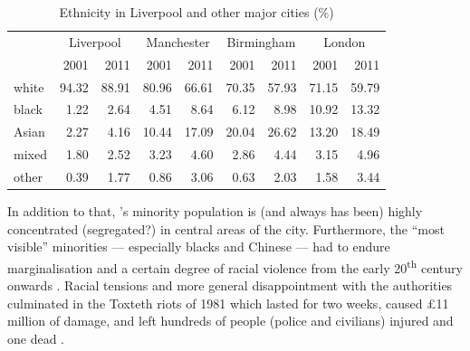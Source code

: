 	\begin{table}[h]
		\centering
		\caption{Ethnicity in Liverpool and other major cities (\%)}
		\begin{tabular}{lrrrrrrrr}
			\hline
	 		& \multicolumn{2}{c}{Liverpool} & \multicolumn{2}{c}{Manchester} & \multicolumn{2}{c}{Birmingham} & \multicolumn{2}{c}{London} \\
			 & 2001 & 2011 & 2001 & 2011 & 2001 & 2011 & 2001 & 2011 \\
			 \hline
			 white & 94.32 & 88.91 & 80.96 & 66.61 & 70.35 & 57.93 & 71.15 & 59.79 \\
			 black & 1.22 & 2.64 & 4.51 & 8.64 & 6.12 & 8.98 & 10.92 & 13.32 \\
	 		 Asian & 2.27 & 4.16 & 10.44 & 17.09 & 20.04 & 26.62 & 13.20 & 18.49 \\
	 		 mixed & 1.80 & 2.52 & 3.23 & 4.60 & 2.86 & 4.44 & 3.15 & 4.96 \\
	 		 other & 0.39 & 1.77 & 0.86 & 3.06 & 0.63 & 2.03 & 1.58 & 3.44 \\
	 		 \hline
		\end{tabular}
		\label{tab.ethnicity}
	\end{table}

In addition to that, 's minority population is (and always has been) highly concentrated (segregated?) in central areas of the city.
Furthermore, the ``most visible'' minorities --- especially blacks and Chinese --- had to endure marginalisation and a certain degree of racial violence from the early 20\textsuperscript{th} century onwards \citep[cf.][189--191]{pooley2006}.
Racial tensions and more general disappointment with the authorities culminated in the Toxteth riots of 1981 which lasted for two weeks, caused \pounds11 million of damage, and left hundreds of people (police and civilians) injured and one dead \citep[cf][440--444]{murden2006}.

